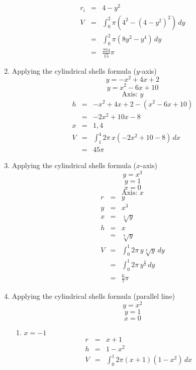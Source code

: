 \documentclass{article}
\begin{document}
\begin{enumerate}
\begin{eqnarray}
            r_i &=& 4 - y^2 \\
            V &=& \int_0^2{\pi\left(4^2 - \left(4 - y^2\right)^2\right)\,dy} \\
              &=& \int_0^2{\pi\left(8y^2 - y^4\right)\,dy} \\
              &=& \frac{224}{15}\pi
        \end{eqnarray}
    \item Applying the cylindrical shells formula ($y$-axis)
        $$y = -x^2 + 4x + 2$$
        $$y = x^2 - 6x + 10$$
        $$\text{Axis: } y$$
        \begin{eqnarray}
            h &=& -x^2 + 4x + 2 - \left(x^2 - 6x + 10\right) \\
              &=& -2x^2 + 10x - 8 \\
            x &=& 1, 4 \\
            V &=& \int_1^4{2\pi\,x\left(-2x^2 + 10 - 8\right)\,dx} \\
              &=& 45\pi
        \end{eqnarray}
    \item Applying the cylindrical shells formula ($x$-axis)
        $$y = x^3$$
        $$y = 1$$
        $$x = 0$$
        $$\text{Axis: } x$$
        \begin{eqnarray}
            r &=& y \\
            y &=& x^3 \\
            x &=& \sqrt[3]{y} \\
            h &=& x \\
              &=& \sqrt[3]{y} \\
            V &=& \int_0^1{2\pi\,y\sqrt[3]{y}\,dy} \\
              &=& \int_0^1{2\pi\,y^{\frac{4}{3}}\,dy} \\
              &=& \frac{6}{7}\pi
        \end{eqnarray}
    \item Applying the cylindrical shells formula (parallel line)
        $$y = x^2$$
        $$y = 1$$
        $$x = 0$$
        \begin{enumerate}
            \item $x = -1$
                \begin{eqnarray}
                    r &=& x + 1 \\
                    h &=& 1 - x^2 \\
                    V &=& \int_0^1{2\pi\left(x + 1\right)\left(1 - x^2\right)\,dx} \\

\end{eqnarray}
\end{enumerate}
\end{enumerate}
\end{document}
